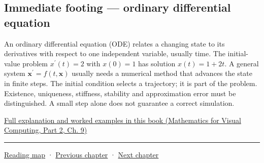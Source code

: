 \subsection{Immediate footing --- ordinary differential equation}\label{02-foundations-ii-ch021-immediate-footing-ordinary-differential-equation}

\hypertarget{02-foundations-ii-ch021-immediate-footing-ordinary-differential-equation}{}

An ordinary differential equation (ODE) relates a changing state to its derivatives with respect to one independent variable, usually time. The initial-value problem \(x^{\prime}(t)=2\) with \(x(0)=1\) has solution \(x(t)=1+2t\). A general system \(\mathbf x^{\prime}=f(t,\mathbf x)\) usually needs a numerical method that advances the state in finite steps. The initial condition selects a trajectory; it is part of the problem. Existence, uniqueness, stiffness, stability and approximation error must be distinguished. A small step alone does not guarantee a correct simulation.

\href{../02-Mathematics-for-Visual-Computing-P02/main.pdf\#02-foundations-ii-ch025-odes-and-numerical-simulation}{Full explanation and worked examples in this book (Mathematics for Visual Computing, Part 2, Ch. 9)}

\begin{center}\rule{0.5\linewidth}{0.5pt}\end{center}

\hyperref[volume-reading-map]{Reading map} · \hyperref[01-foundations-i-ch020-choose-matrix-factorizations-from-structure]{Previous chapter} · \hyperref[02-foundations-ii-ch022-accumulation-quadrature-and-the-bridge-to-probability]{Next chapter}
